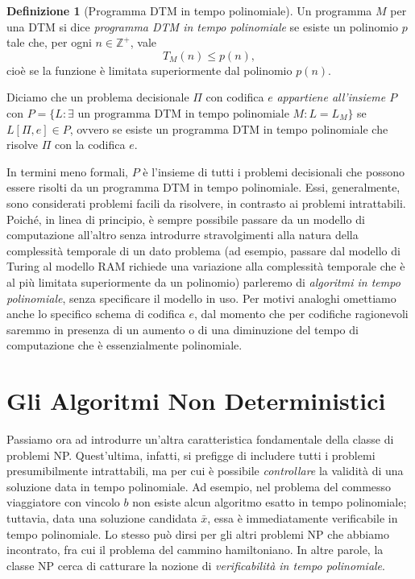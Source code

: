 \documentclass[10pt]{\classname}
\theoremstyle{newlinethm}
\theoremstyle{theorem}
\theoremstyle{definition}
\newtheorem{definizione}{Definizione}[section]
\theoremstyle{definition}
\theoremstyle{definition}
\theoremstyle{definition}
\begin{document}
\begin{definizione}[Programma DTM in tempo polinomiale]
    Un programma $M$ per una DTM si dice \emph{programma DTM in tempo polinomiale} se esiste un polinomio $p$ tale che, per ogni $n \in \mathbb Z^+$, vale \[T_M(n) \leq p(n),\] cioè se la funzione è limitata superiormente dal polinomio $p(n)$.

    Diciamo che un problema decisionale $\Pi$ con codifica $e$ \emph{appartiene all'insieme $P$} con $P = \{L : \exists \mbox{ un programma DTM in tempo polinomiale } M : L=L_M\}$ se $L[\Pi, e] \in P$, ovvero se esiste un programma DTM in tempo polinomiale che risolve $\Pi$ con la codifica $e$.
\end{definizione}

In termini meno formali, $P$ è l'insieme di tutti i problemi decisionali che possono essere risolti da un programma DTM in tempo polinomiale. Essi, generalmente, sono considerati problemi facili da risolvere, in contrasto ai problemi intrattabili. Poiché, in linea di principio, è sempre possibile passare da un modello di computazione all'altro senza introdurre stravolgimenti alla natura della complessità temporale di un dato problema (ad esempio, passare dal modello di Turing al modello RAM richiede una variazione alla complessità temporale che è al più limitata superiormente da un polinomio) parleremo di \emph{algoritmi in tempo polinomiale}, senza specificare il modello in uso. Per motivi analoghi omettiamo anche lo specifico schema di codifica $e$, dal momento che per codifiche ragionevoli saremmo in presenza di un aumento o di una diminuzione del tempo di computazione che è essenzialmente polinomiale.

\section{Gli Algoritmi Non Deterministici}

Passiamo ora ad introdurre un'altra caratteristica fondamentale della classe di problemi NP. Quest'ultima, infatti, si prefigge di includere tutti i problemi presumibilmente intrattabili, ma per cui è possibile \emph{controllare} la validità di una soluzione data in tempo polinomiale. Ad esempio, nel problema del commesso viaggiatore con vincolo $b$ non esiste alcun algoritmo esatto in tempo polinomiale; tuttavia, data una soluzione candidata $\bar x$, essa è immediatamente verificabile in tempo polinomiale. Lo stesso può dirsi per gli altri problemi NP che abbiamo incontrato, fra cui il problema del cammino hamiltoniano. In altre parole, la classe NP cerca di catturare la nozione di \emph{verificabilità in tempo polinomiale}.
\end{document}
